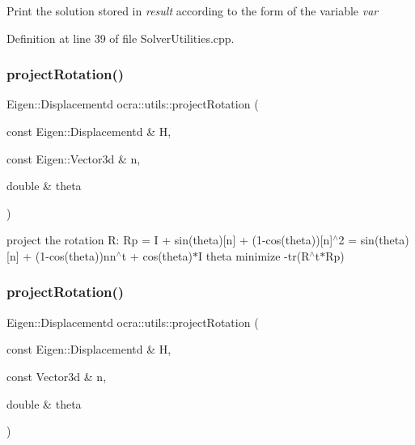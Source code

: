 Print the solution stored in {\itshape result} according to the form of the variable {\itshape var} 

Definition at line 39 of file Solver\+Utilities.\+cpp.

\hypertarget{namespaceocra_1_1utils_a0c4be9b19e14fb7dfb9ae92650267dba}{}\label{namespaceocra_1_1utils_a0c4be9b19e14fb7dfb9ae92650267dba} 
\subsubsection{\texorpdfstring{project\+Rotation()}{projectRotation()}\hspace{0.1cm}{\footnotesize\ttfamily [1/2]}}
{\footnotesize\ttfamily Eigen\+::\+Displacementd ocra\+::utils\+::project\+Rotation (\begin{DoxyParamCaption}\item[{const Eigen\+::\+Displacementd \&}]{H,  }\item[{const Eigen\+::\+Vector3d \&}]{n,  }\item[{double \&}]{theta }\end{DoxyParamCaption})}

project the rotation R\+: Rp = I + sin(theta)\mbox{[}n\mbox{]} + (1-\/cos(theta))\mbox{[}n\mbox{]}$^\wedge$2 = sin(theta)\mbox{[}n\mbox{]} + (1-\/cos(theta))nn$^\wedge$t + cos(theta)$\ast$I theta minimize -\/tr(R$^\wedge$t$\ast$\+Rp) \hypertarget{namespaceocra_1_1utils_a07cf93b22e02458b2c184ddd5787a6b2}{}\label{namespaceocra_1_1utils_a07cf93b22e02458b2c184ddd5787a6b2} 
\subsubsection{\texorpdfstring{project\+Rotation()}{projectRotation()}\hspace{0.1cm}{\footnotesize\ttfamily [2/2]}}
{\footnotesize\ttfamily Eigen\+::\+Displacementd ocra\+::utils\+::project\+Rotation (\begin{DoxyParamCaption}\item[{const Eigen\+::\+Displacementd \&}]{H,  }\item[{const Vector3d \&}]{n,  }\item[{double \&}]{theta }\end{DoxyParamCaption})}



